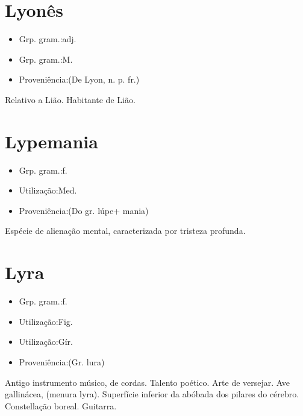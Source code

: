 \section{Lyonês}
\begin{itemize}
\item {Grp. gram.:adj.}
\end{itemize}
\begin{itemize}
\item {Grp. gram.:M.}
\end{itemize}
\begin{itemize}
\item {Proveniência:(De \textunderscore Lyon\textunderscore , n. p. fr.)}
\end{itemize}
Relativo a Lião.
Habitante de Lião.
\section{Lypemania}
\begin{itemize}
\item {Grp. gram.:f.}
\end{itemize}
\begin{itemize}
\item {Utilização:Med.}
\end{itemize}
\begin{itemize}
\item {Proveniência:(Do gr. \textunderscore lúpe\textunderscore  + \textunderscore mania\textunderscore )}
\end{itemize}
Espécie de alienação mental, caracterizada por tristeza profunda.
\section{Lyra}
\begin{itemize}
\item {Grp. gram.:f.}
\end{itemize}
\begin{itemize}
\item {Utilização:Fig.}
\end{itemize}
\begin{itemize}
\item {Utilização:Gír.}
\end{itemize}
\begin{itemize}
\item {Proveniência:(Gr. \textunderscore lura\textunderscore )}
\end{itemize}
Antigo instrumento músico, de cordas.
Talento poético.
Arte de versejar.
Ave gallinácea, (\textunderscore menura lyra\textunderscore ).
Superfície inferior da abóbada dos pilares do cérebro.
Constellação boreal.
Guitarra.

